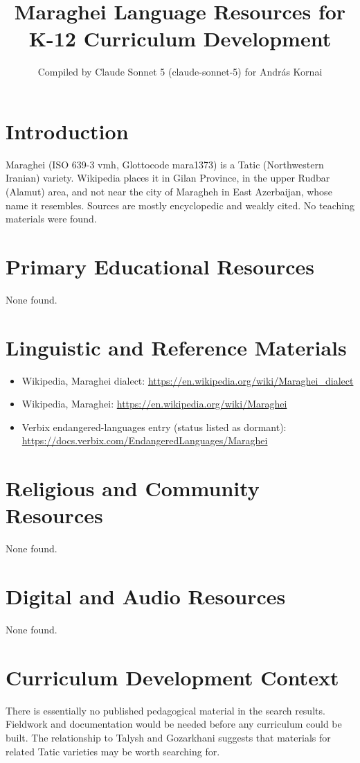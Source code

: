 \documentclass[12pt]{article}
\title{Maraghei Language Resources for K-12 Curriculum Development}
\author{Compiled by Claude Sonnet 5 (claude-sonnet-5) for Andr\'as Kornai}
\date{}
\begin{document}
\maketitle
\section{Introduction}
Maraghei (ISO 639-3 vmh, Glottocode mara1373) is a Tatic (Northwestern Iranian) variety. Wikipedia places it in Gilan Province, in the upper Rudbar (Alamut) area, and not near the city of Maragheh in East Azerbaijan, whose name it resembles. Sources are mostly encyclopedic and weakly cited. No teaching materials were found.
\section{Primary Educational Resources}
None found.
\section{Linguistic and Reference Materials}
\begin{itemize}
\item Wikipedia, Maraghei dialect: \url{https://en.wikipedia.org/wiki/Maraghei_dialect}
\item Wikipedia, Maraghei: \url{https://en.wikipedia.org/wiki/Maraghei}
\item Verbix endangered-languages entry (status listed as dormant): \url{https://docs.verbix.com/EndangeredLanguages/Maraghei}
\end{itemize}
\section{Religious and Community Resources}
None found.
\section{Digital and Audio Resources}
None found.
\section{Curriculum Development Context}
There is essentially no published pedagogical material in the search results. Fieldwork and documentation would be needed before any curriculum could be built. The relationship to Talysh and Gozarkhani suggests that materials for related Tatic varieties may be worth searching for.
\end{document}
